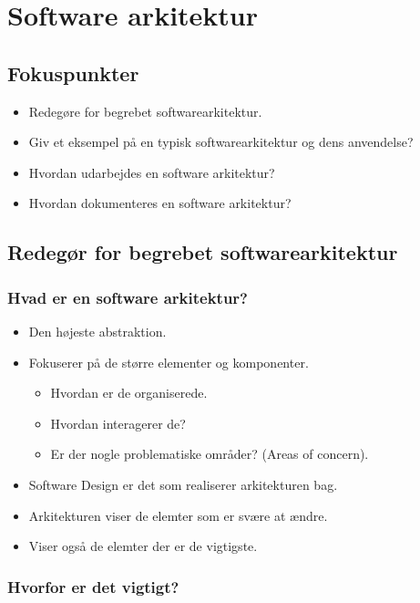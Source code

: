 \section{Software arkitektur}

\subsection{Fokuspunkter}

\begin{itemize}
	\item Redegøre for begrebet softwarearkitektur.
	\item Giv et eksempel på en typisk softwarearkitektur og dens anvendelse?
	\item Hvordan udarbejdes en software arkitektur?
	\item Hvordan dokumenteres en software arkitektur?
\end{itemize}

\subsection{Redegør for begrebet softwarearkitektur}

\subsubsection{Hvad er en software arkitektur?}
\begin{itemize}
	\item Den højeste abstraktion.
	\item Fokuserer på de større elementer og komponenter.
	\begin{itemize}
		\item Hvordan er de organiserede.
		\item Hvordan interagerer de?
		\item Er der nogle problematiske områder? (Areas of concern).
	\end{itemize}
	\item Software Design er det som realiserer arkitekturen bag.
	\item Arkitekturen viser de elemter som er svære at ændre.
	\item Viser også de elemter der er de vigtigste.
\end{itemize}

\subsubsection{Hvorfor er det vigtigt?}

